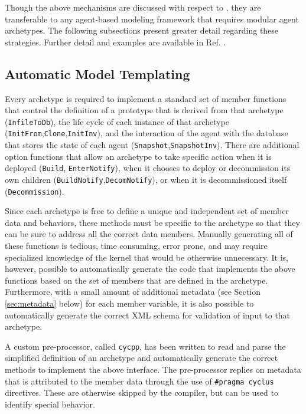 Though the above mechanisms are discussed with respect to \Cyclus, they are
transferable to any agent-based modeling framework that requires modular agent
archetypes. The following subsections present greater detail regarding these
strategies.  Further detail and examples are available in
Ref. .

\subsection{Automatic Model Templating}
\label{sec:code_gen}

Every \Cyclus archetype is required to implement a standard set of member
functions that control the definition of a prototype that is derived from that
archetype (\texttt{InfileToDb}), the life cycle of each instance of that
archetype (\texttt{InitFrom},\texttt{Clone},\texttt{InitInv}), and the
interaction of the agent with the database that stores the state of each agent
(\texttt{Snapshot},\texttt{SnapshotInv}).  There are additional option
functions that allow an archetype to take specific action when it is deployed
(\texttt{Build}, \texttt{EnterNotify}), when it chooses to deploy or
decommission its own children (\texttt{BuildNotify},\texttt{DecomNotify}), or
when it is decommissioned itself (\texttt{Decommission}).

Since each archetype is free to define a unique and independent set of member
data and behaviors, these methods must be specific to the archetype so that
they can be sure to address all the correct data members.  Manually generating
all of these functions is tedious, time consuming, error prone, and may
require specialized knowledge of the \Cyclus kernel that would be otherwise
unnecessary.  It is, however, possible to automatically generate the code that
implements the above functions based on the set of members that are defined in
the archetype.  Furthermore, with a small amount of additional metadata (see
Section \ref{sec:metadata} below) for each member variable, it is also
possible to automatically generate the correct \gls{XML} schema for validation
of input to that archetype.

A custom pre-processor, called \texttt{cycpp}, has been written to read and
parse the simplified definition of an archetype and automatically generate the
correct methods to implement the above interface.  The pre-processor replies on
metadata that is attributed to the member data through the use of
\texttt{\#pragma cyclus} directives.  These are otherwise skipped by the
compiler, but can be used to identify special behavior.

